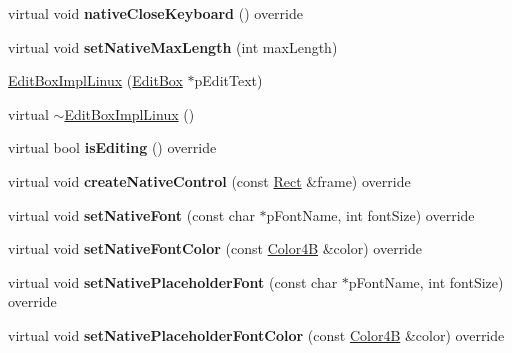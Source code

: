 \begin{DoxyCompactItemize}
\mbox{\label{classui_1_1EditBoxImplLinux_af563fee51a75e14e2165a94c8e19dd10}} 
virtual void {\bfseries native\+Close\+Keyboard} () override
\item 
\mbox{\label{classui_1_1EditBoxImplLinux_a0d1ee09aa6fc57fe9575e9a45c8bc023}} 
virtual void {\bfseries set\+Native\+Max\+Length} (int max\+Length)
\item 
\hyperlink{classui_1_1EditBoxImplLinux_a1547fb366cb608504b34087736432c76}{Edit\+Box\+Impl\+Linux} (\hyperlink{classui_1_1EditBox}{Edit\+Box} $\ast$p\+Edit\+Text)
\item 
virtual \hyperlink{classui_1_1EditBoxImplLinux_a0feb8feda1d77ba2cdfa6e13f4fa822c}{$\sim$\+Edit\+Box\+Impl\+Linux} ()
\item 
\mbox{\label{classui_1_1EditBoxImplLinux_a74c3233fc1c4c52cd06866841de1e436}} 
virtual bool {\bfseries is\+Editing} () override
\item 
\mbox{\label{classui_1_1EditBoxImplLinux_ad25198f149f11eb3fb25d2fdedc6d326}} 
virtual void {\bfseries create\+Native\+Control} (const \hyperlink{classRect}{Rect} \&frame) override
\item 
\mbox{\label{classui_1_1EditBoxImplLinux_a23c7932904904d3475cd289943890083}} 
virtual void {\bfseries set\+Native\+Font} (const char $\ast$p\+Font\+Name, int font\+Size) override
\item 
\mbox{\label{classui_1_1EditBoxImplLinux_a319fe00d9b8c5b3831a298c3cf21baf8}} 
virtual void {\bfseries set\+Native\+Font\+Color} (const \hyperlink{structColor4B}{Color4B} \&color) override
\item 
\mbox{\label{classui_1_1EditBoxImplLinux_a1a26f48cb778a71b0ed3f5a54ef42cd0}} 
virtual void {\bfseries set\+Native\+Placeholder\+Font} (const char $\ast$p\+Font\+Name, int font\+Size) override
\item 
\mbox{\label{classui_1_1EditBoxImplLinux_a6176c03b6986b5fae3a115adc7784bc6}} 
virtual void {\bfseries set\+Native\+Placeholder\+Font\+Color} (const \hyperlink{structColor4B}{Color4B} \&color) override

\end{DoxyCompactItemize}
